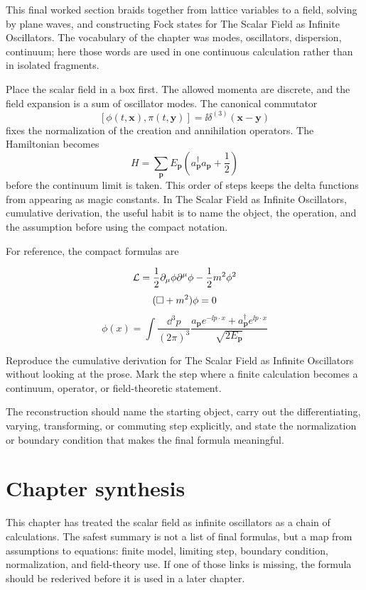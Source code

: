 This final worked section braids together from lattice variables to a field, solving by plane waves, and constructing Fock states for The Scalar Field as Infinite Oscillators.  The vocabulary of the chapter was modes, oscillators, dispersion, continuum; here those words are used in one continuous calculation rather than in isolated fragments.

Place the scalar field in a box first.  The allowed momenta are discrete, and the field expansion is a sum of oscillator modes.  The canonical commutator
\[
  [\phi(t,\bm x),\pi(t,\bm y)]=\ii\delta^{(3)}(\bm x-\bm y)
\]
fixes the normalization of the creation and annihilation operators.  The Hamiltonian becomes
\[
  H=\sum_{\bm p}E_{\bm p}\left(a_{\bm p}^\dagger a_{\bm p}+\frac12\right)
\]
before the continuum limit is taken.  This order of steps keeps the delta functions from appearing as magic constants.  In The Scalar Field as Infinite Oscillators, cumulative derivation, the useful habit is to name the object, the operation, and the assumption before using the compact notation.

For reference, the compact formulas are

\[
  \mathcal L=\frac12\partial_\mu\phi\partial^\mu\phi-\frac12m^2\phi^2
\]
\[
  (\Box+m^2)\phi=0
\]
\[
  \phi(x)=\int\frac{\dd^3p}{(2\pi)^3}\frac{a_{\bm p}e^{-\ii p\cdot x}+a_{\bm p}^\dagger e^{\ii p\cdot x}}{\sqrt{2E_{\bm p}}}
\]

\begin{exercise}
Reproduce the cumulative derivation for The Scalar Field as Infinite Oscillators without looking at the prose.  Mark the step where a finite calculation becomes a continuum, operator, or field-theoretic statement.
\begin{answer}
The reconstruction should name the starting object, carry out the differentiating, varying, transforming, or commuting step explicitly, and state the normalization or boundary condition that makes the final formula meaningful.
\end{answer}
\end{exercise}



\section{Chapter synthesis}

This chapter has treated the scalar field as infinite oscillators as a chain of calculations.  The safest summary is not a list of final formulas, but a map from assumptions to equations: finite model, limiting step, boundary condition, normalization, and field-theory use.  If one of those links is missing, the formula should be rederived before it is used in a later chapter.

